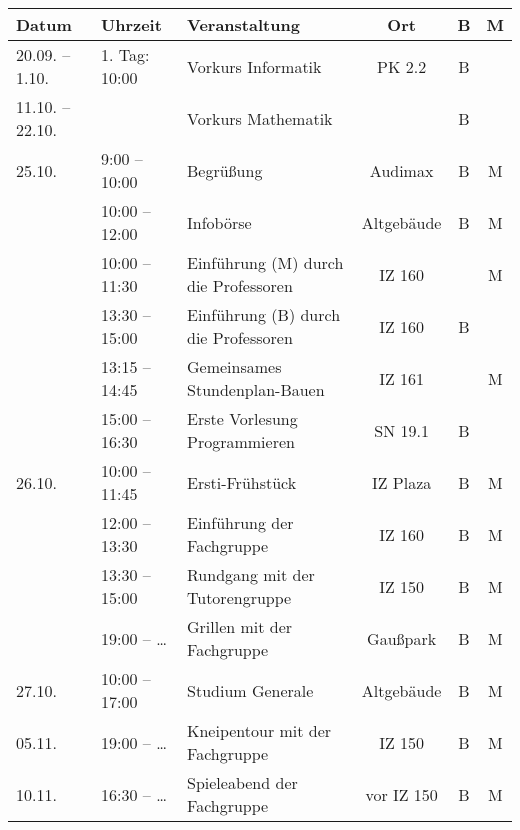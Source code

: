 
\begin{tabular}{|l|l|p{6.7cm}|c|c|c|}
\hline \textbf{Datum} & \textbf{Uhrzeit} & \textbf{Veranstaltung}	& \textbf{Ort} & \textbf{B} & \textbf{M} \\
\hline 20.09. – 1.10.	& 1. Tag: 10:00	 & Vorkurs Informatik						& PK 2.2		&B& \\
\hline 11.10. – 22.10. 	&		 & Vorkurs Mathematik 								&				&B& \\
\hline 25.10.	&  9:00 – 10:00	 & Begrüßung										& Audimax		&B&M\\ %
\hline 			& 10:00 – 12:00	 & Infobörse										& Altgebäude	&B&M\\
\hline  	& 10:00 – 11:30	 & Einführung (M) \newline durch die Professoren	& IZ 160	& &M\\
\hline 			& 13:30 – 15:00	 & Einführung (B) \newline durch die Professoren	& IZ 160	&B& \\
\hline 			& 13:15 – 14:45	 & Gemeinsames Stundenplan-Bauen					& IZ 161		& &M\\
\hline 			& 15:00 – 16:30	 & Erste Vorlesung Programmieren					& SN 19.1		&B& \\
\hline 26.10.	& 10:00 – 11:45	 & Ersti-Frühstück									& IZ Plaza		&B&M\\
\hline 			& 12:00 – 13:30	 & Einführung  der Fachgruppe					& IZ 160		&B&M\\
\hline 			& 13:30 – 15:00	 & Rundgang  \newline mit der Tutorengruppe		& IZ 150		&B&M \\
\hline 			& 19:00 – \ldots & Grillen mit der Fachgruppe						& Gaußpark		&B&M\\
\hline 27.10.	& 10:00 – 17:00	 & Studium Generale									& Altgebäude	&B&M\\
\hline 05.11.	& 19:00 – \ldots & Kneipentour mit der Fachgruppe					& IZ 150		&B&M\\
\hline 10.11.	& 16:30 – \ldots & Spieleabend der Fachgruppe						& vor IZ 150	&B&M\\ 
\hline
\end{tabular} 
